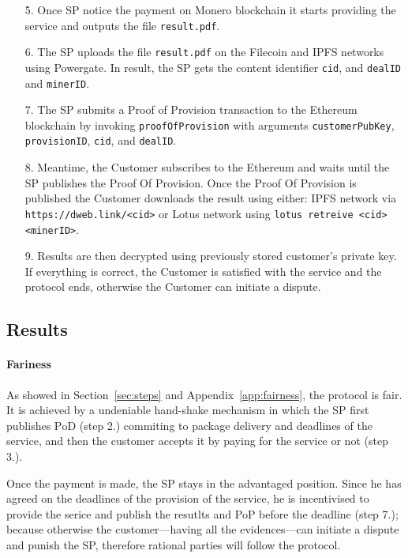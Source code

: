 \documentclass{ieeeaccess}
\begin{document}
\begin{enumerate}
  \item[5.] Once SP notice the payment on Monero blockchain it starts providing the service and outputs the file \texttt{result.pdf}.

  \item[6.] The SP uploads the file \texttt{result.pdf} on the Filecoin and IPFS networks using Powergate. In result, the SP gets the content identifier \texttt{cid}, and \texttt{dealID} and \texttt{minerID}.

  \item[7.] The SP submits a Proof of Provision transaction to the Ethereum blockchain by invoking \texttt{proofOfProvision} with arguments \texttt{customer\-PubKey}, \texttt{provisionID}, \texttt{cid}, and \texttt{dealID}.

  \item[8.] Meantime, the Customer subscribes to the Ethereum and waits until the SP publishes the Proof Of Provision.
 Once the Proof Of Provision is published the Customer downloads the result using either: IPFS network via \texttt{https://dweb.link/<cid>} or Lotus network using \texttt{lotus retreive <cid> <minerID>}. 
 
  \item[9.] Results are then decrypted using previously stored customer's private key. If everything is correct, the Customer is satisfied with the service and the protocol ends, otherwise the Customer can initiate a dispute.

\end{enumerate}

\subsection{Results}


\paragraph{Fariness}
As showed in Section~\ref{sec:steps} and Appendix~\ref{app:fairness}, the protocol is fair. It is achieved by a undeniable hand-shake mechanism in which the SP first publishes $\mathrm{PoD}$ (step 2.) commiting to package delivery and deadlines of the service, and then the customer accepts it by paying for the service or not (step 3.).

Once the payment is made, the SP stays in the advantaged position. Since he has agreed on the deadlines of the provision of the service, he is incentivised to provide the serice and publish the resutlts and PoP before the deadline (step 7.); because otherwise the customer—having all the evidences—can initiate a dispute and punish the SP, therefore rational parties will follow the protocol.
\end{document}
